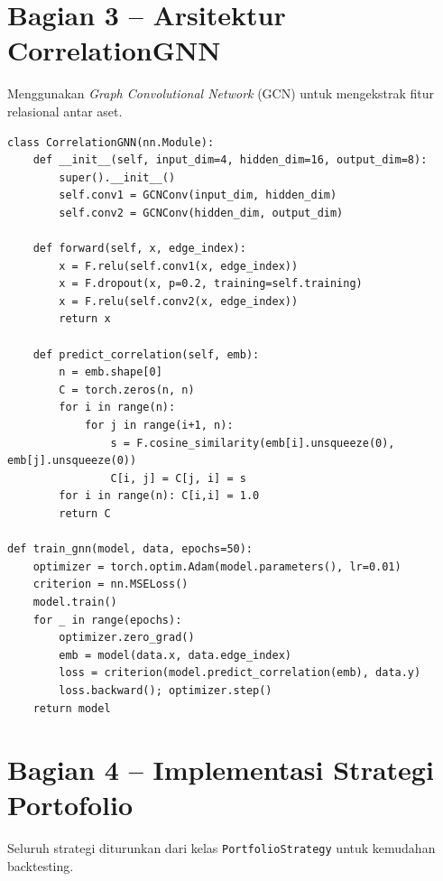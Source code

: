 \documentclass[12pt,a4paper]{article}
\begin{document}
\section{Bagian 3 -- Arsitektur CorrelationGNN}
Menggunakan \textit{Graph Convolutional Network} (GCN) untuk mengekstrak fitur relasional antar aset.

\begin{lstlisting}[caption={GNN Model dan fungsi latih}]
class CorrelationGNN(nn.Module):
    def __init__(self, input_dim=4, hidden_dim=16, output_dim=8):
        super().__init__()
        self.conv1 = GCNConv(input_dim, hidden_dim)
        self.conv2 = GCNConv(hidden_dim, output_dim)

    def forward(self, x, edge_index):
        x = F.relu(self.conv1(x, edge_index))
        x = F.dropout(x, p=0.2, training=self.training)
        x = F.relu(self.conv2(x, edge_index))
        return x

    def predict_correlation(self, emb):
        n = emb.shape[0]
        C = torch.zeros(n, n)
        for i in range(n):
            for j in range(i+1, n):
                s = F.cosine_similarity(emb[i].unsqueeze(0), emb[j].unsqueeze(0))
                C[i, j] = C[j, i] = s
        for i in range(n): C[i,i] = 1.0
        return C

def train_gnn(model, data, epochs=50):
    optimizer = torch.optim.Adam(model.parameters(), lr=0.01)
    criterion = nn.MSELoss()
    model.train()
    for _ in range(epochs):
        optimizer.zero_grad()
        emb = model(data.x, data.edge_index)
        loss = criterion(model.predict_correlation(emb), data.y)
        loss.backward(); optimizer.step()
    return model
\end{lstlisting}

\section{Bagian 4 -- Implementasi Strategi Portofolio}
Seluruh strategi diturunkan dari kelas \texttt{PortfolioStrategy} untuk kemudahan backtesting.
\end{document}
